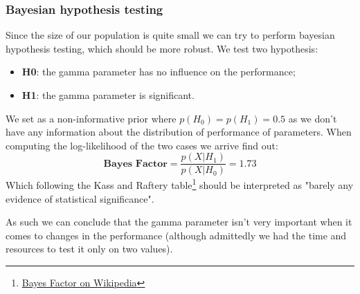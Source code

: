 \documentclass[a4paper,12pt]{article}
\begin{document}
\subsubsection*{Bayesian hypothesis testing}
Since the size of our population is quite small we can try to perform bayesian hypothesis testing, which should be more robust. We test two hypothesis:
\begin{itemize}
    \item \textbf{H0}: the gamma parameter has no influence on the performance;
    \item \textbf{H1}: the gamma parameter is significant.
\end{itemize}
We set as a non-informative prior where $p(H_0) = p(H_1) = 0.5$ as we don't have any information about the distribution of performance of parameters. 
When computing the log-likelihood of the two cases we arrive find out:
$$\textbf{Bayes Factor} = \frac{p(X|H_1)}{p(X|H_0)} = 1.73$$
Which following the Kass and Raftery table\footnote{\href{https://en.wikipedia.org/wiki/Bayes_factor\#Interpretation}{Bayes Factor on Wikipedia}} should be interpreted as "barely any evidence of statistical significance".

As such we can conclude that the gamma parameter isn't very important when it comes to changes in the performance (although admittedly we had the time and resources to test it only on two values). 
\end{document}
